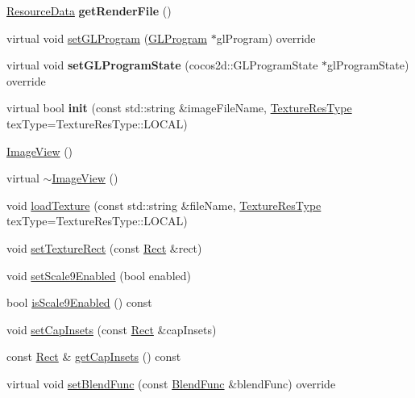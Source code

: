 \begin{DoxyCompactItemize}
\hyperlink{structResourceData}{Resource\+Data} {\bfseries get\+Render\+File} ()
\item 
virtual void \hyperlink{classui_1_1ImageView_a98d9a45e777ea30849634eacf5b58509}{set\+G\+L\+Program} (\hyperlink{classGLProgram}{G\+L\+Program} $\ast$gl\+Program) override
\item 
\mbox{\label{classui_1_1ImageView_ad8de1295b868d682b07c28ddb0c9df73}} 
virtual void {\bfseries set\+G\+L\+Program\+State} (cocos2d\+::\+G\+L\+Program\+State $\ast$gl\+Program\+State) override
\item 
\mbox{\label{classui_1_1ImageView_ac6b1ac1c6c009d238ff1044338449bd0}} 
virtual bool {\bfseries init} (const std\+::string \&image\+File\+Name, \hyperlink{classui_1_1Widget_a040a65ec5ad3b11119b7e16b98bd9af0}{Texture\+Res\+Type} tex\+Type=Texture\+Res\+Type\+::\+L\+O\+C\+AL)
\item 
\hyperlink{classui_1_1ImageView_ab59faa92167986fd548f9f097a0990fd}{Image\+View} ()
\item 
virtual \hyperlink{classui_1_1ImageView_a0e8c63d31b918dec30fed356130cf2bc}{$\sim$\+Image\+View} ()
\item 
void \hyperlink{classui_1_1ImageView_a68ef2268cecbf1ccaf2efb05254e01c5}{load\+Texture} (const std\+::string \&file\+Name, \hyperlink{classui_1_1Widget_a040a65ec5ad3b11119b7e16b98bd9af0}{Texture\+Res\+Type} tex\+Type=Texture\+Res\+Type\+::\+L\+O\+C\+AL)
\item 
void \hyperlink{classui_1_1ImageView_a776968265a527b05e1d13797707e5e2c}{set\+Texture\+Rect} (const \hyperlink{classRect}{Rect} \&rect)
\item 
void \hyperlink{classui_1_1ImageView_a0bb86e839e826007cc92f362c0ae3794}{set\+Scale9\+Enabled} (bool enabled)
\item 
bool \hyperlink{classui_1_1ImageView_a773635821f82515c3fab2b1bf1715587}{is\+Scale9\+Enabled} () const
\item 
void \hyperlink{classui_1_1ImageView_aaca6b6106d235cadd64a19cf2255f218}{set\+Cap\+Insets} (const \hyperlink{classRect}{Rect} \&cap\+Insets)
\item 
const \hyperlink{classRect}{Rect} \& \hyperlink{classui_1_1ImageView_aad585cd739b5ae6756be8b46542b297e}{get\+Cap\+Insets} () const
\item 
virtual void \hyperlink{classui_1_1ImageView_a83568955f3596eb310606f4b2181dd9b}{set\+Blend\+Func} (const \hyperlink{structBlendFunc}{Blend\+Func} \&blend\+Func) override

\end{DoxyCompactItemize}
